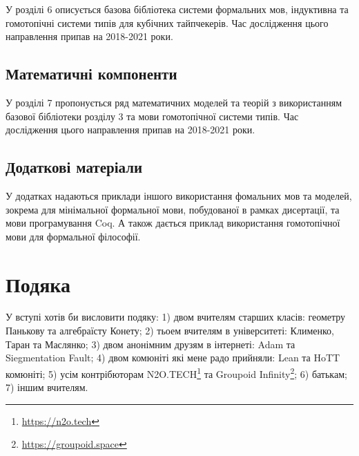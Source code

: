 У розділі 6 описується базова бібліотека системи формальних мов, індуктивна
та гомотопічні системи типів для кубічних тайпчекерів.
Час дослідження цього направлення припав на 2018-2021 роки.

\newpage
\subsection*{Математичні компоненти}
У розділі 7 пропонується ряд математичних моделей та теорій з використанням
базової бібліотеки розділу 3 та мови гомотопічної системи типів.
Час дослідження цього направлення припав на 2018-2021 роки.

\subsection*{Додаткові матеріали}
У додатках надаються приклади іншого використання фомальних мов та моделей,
зокрема для мінімальної формальної мови, побудованої в рамках дисертації,
та мови програмування Coq. А також дається приклад використання
гомотопічної мови для формальної філософії.

\section{Подяка}
У вступі хотів би висловити подяку:
1) двом вчителям старших класів: геометру Панькову та алгебраїсту Конету;
2) тьоем вчителям в університеті: Клименко, Таран та Маслянко;
3) двом анонімним друзям в інтернеті: Adam та Siegmentation Fault;
4) двом комюніті які мене радо прийняли: Lean та HoTT комюніті;
5) усім контрібюторам N2O.TECH\footnote{\url{https://n2o.tech}} та Groupoid Infinity\footnote{\url{https://groupoid.space}};
6) батькам;
7) іншим вчителям.
